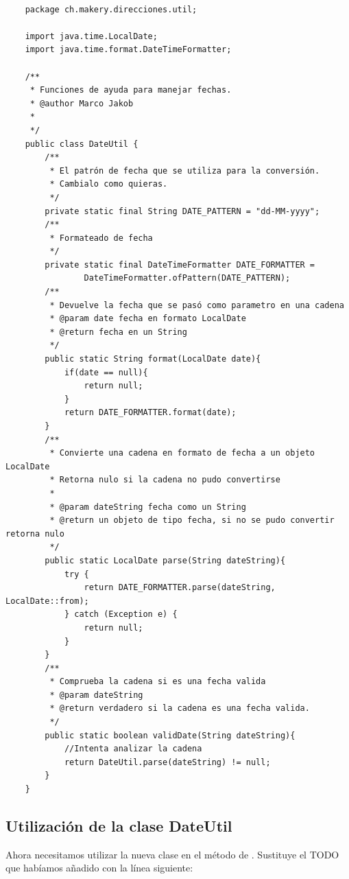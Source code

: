 \begin{verbatim}

    package ch.makery.direcciones.util;

    import java.time.LocalDate;
    import java.time.format.DateTimeFormatter;
    
    /**
     * Funciones de ayuda para manejar fechas.
     * @author Marco Jakob
     *
     */
    public class DateUtil {
        /**
         * El patrón de fecha que se utiliza para la conversión.
         * Cambialo como quieras.
         */
        private static final String DATE_PATTERN = "dd-MM-yyyy";
        /**
         * Formateado de fecha
         */
        private static final DateTimeFormatter DATE_FORMATTER =
                DateTimeFormatter.ofPattern(DATE_PATTERN);
        /**
         * Devuelve la fecha que se pasó como parametro en una cadena
         * @param date fecha en formato LocalDate
         * @return fecha en un String
         */
        public static String format(LocalDate date){
            if(date == null){
                return null;
            }
            return DATE_FORMATTER.format(date);
        }
        /**
         * Convierte una cadena en formato de fecha a un objeto LocalDate
         * Retorna nulo si la cadena no pudo convertirse
         *
         * @param dateString fecha como un String
         * @return un objeto de tipo fecha, si no se pudo convertir retorna nulo
         */
        public static LocalDate parse(String dateString){
            try {
                return DATE_FORMATTER.parse(dateString, LocalDate::from);
            } catch (Exception e) {
                return null;
            }
        }
        /**
         * Comprueba la cadena si es una fecha valida
         * @param dateString
         * @return verdadero si la cadena es una fecha valida.
         */
        public static boolean validDate(String dateString){
            //Intenta analizar la cadena
            return DateUtil.parse(dateString) != null;
        }
    }

\end{verbatim}

\subsection{Utilización de la clase DateUtil}
Ahora necesitamos utilizar la nueva clase  en el método  de 
. Sustituye el TODO que habíamos añadido con la línea siguiente:

